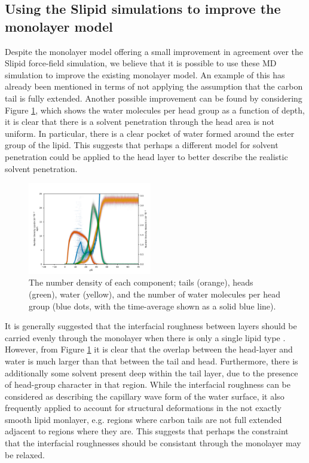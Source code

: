 \documentclass[amsmath,amssymb,twocolumn,superscriptaddress,aps,prl]{revtex4-1}
\begin{document}
\subsection{Using the Slipid simulations to improve the monolayer model}
Despite the monolayer model offering a small improvement in agreement over the Slipid force-field simulation, we believe that it is possible to use these MD simulation to improve the existing monolayer model.
An example of this has already been mentioned in terms of not applying the assumption that the carbon tail is fully extended. 
Another possible improvement can be found by considering Figure \ref{fig:nb}, which shows the water molecules per head group as a function of depth, it is clear that there is a solvent penetration through the head area is not uniform.
In particular, there is a clear pocket of water formed around the ester group of the lipid. 
This suggests that perhaps a different model for solvent penetration could be applied to the head layer to better describe the realistic solvent penetration. 
%
\begin{figure}
\centering
  \includegraphics[width=0.48\textwidth]{figures/number_density}
  \caption{The number density of each component; tails (orange), heads (green), water (yellow), and the number of water molecules per head group (blue dots, with the time-average shown as a solid blue line).}
  \label{fig:nb}
\end{figure}
%

It is generally suggested that the interfacial roughness between layers should be carried evenly through the monolayer when there is only a single lipid type \cite{Campbell2018}. 
However, from Figure \ref{fig:nb} it is clear that the overlap between the head-layer and water is much larger than that between the tail and head. 
Furthermore, there is additionally some solvent present deep within the tail layer, due to the presence of head-group character in that region. 
While the interfacial roughness can be considered as describing the capillary wave form of the water surface, it also frequently applied to account for structural deformations in the not exactly smooth lipid monlayer, e.g. regions where carbon tails are not full extended adjacent to regions where they are. 
This suggests that perhaps the constraint that the interfacial roughnesses should be consistant through the monolayer may be relaxed. 
\end{document}
